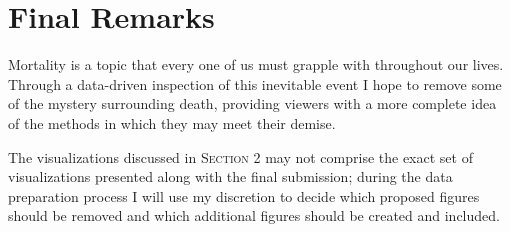 \section{Final Remarks}

Mortality is a topic that every one of us must grapple with throughout our lives. Through a data-driven inspection of this inevitable event I hope to remove some of the mystery surrounding death, providing viewers with a more complete idea of the methods in which they may meet their demise.

The visualizations discussed in \textsc{Section 2} may not comprise the exact set of visualizations presented along with the final submission; during the data preparation process I will use my discretion to decide which proposed figures should be removed and which additional figures should be created and included.



